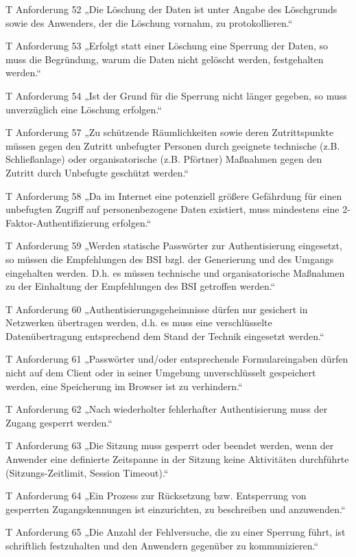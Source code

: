 T Anforderung 52
„Die Löschung der Daten ist unter Angabe des Löschgrunds sowie des Anwenders, der die Löschung vornahm, zu protokollieren.“

T Anforderung 53
„Erfolgt statt einer Löschung eine Sperrung der Daten, so muss die Begründung, warum die Daten nicht gelöscht werden, festgehalten werden.“

T Anforderung 54
„Ist der Grund für die Sperrung nicht länger gegeben, so muss unverzüglich eine Löschung erfolgen.“

T Anforderung 57
„Zu schützende Räumlichkeiten sowie deren Zutrittspunkte müssen gegen den Zutritt unbefugter Personen durch geeignete technische (z.B. Schließanlage) oder organisatorische (z.B. Pförtner) Maßnahmen gegen den Zutritt durch Unbefugte geschützt werden.“

T Anforderung 58
„Da im Internet eine potenziell größere Gefährdung für einen unbefugten Zugriff auf personenbezogene Daten existiert, muss mindestens eine 2-Faktor-Authentifizierung erfolgen.“

T Anforderung 59
„Werden statische Passwörter zur Authentisierung eingesetzt, so müssen die Empfehlungen des BSI bzgl. der Generierung und des Umgangs eingehalten werden. D.h. es müssen technische und organisatorische Maßnahmen zu der Einhaltung der Empfehlungen des BSI getroffen werden.“

T Anforderung 60
„Authentisierungsgeheimnisse dürfen nur gesichert in Netzwerken übertragen werden, d.h. es muss eine verschlüsselte Datenübertragung entsprechend dem Stand der Technik eingesetzt werden.“

T Anforderung 61
„Passwörter und/oder entsprechende Formulareingaben dürfen nicht auf dem Client oder in seiner Umgebung unverschlüsselt gespeichert werden, eine Speicherung im Browser ist zu verhindern.“

T Anforderung 62
„Nach wiederholter fehlerhafter Authentisierung muss der Zugang gesperrt werden.“

T Anforderung 63
„Die Sitzung muss gesperrt oder beendet werden, wenn der Anwender eine definierte Zeitspanne in der Sitzung keine Aktivitäten durchführte (Sitzungs-Zeitlimit, Session Timeout).“

T Anforderung 64
„Ein Prozess zur Rücksetzung bzw. Entsperrung von gesperrten Zugangskennungen ist einzurichten, zu beschreiben und anzuwenden.“

T Anforderung 65
„Die Anzahl der Fehlversuche, die zu einer Sperrung führt, ist schriftlich festzuhalten und den Anwendern gegenüber zu kommunizieren.“

